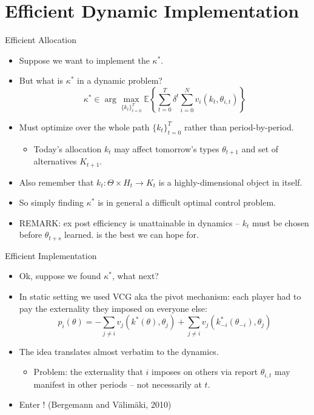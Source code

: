 \documentclass[english,10pt
,aspectratio=169
]{beamer}
\begin{document}
\section{Efficient Dynamic Implementation}

\begin{frame}{Efficient Allocation}
\begin{itemize}
	\item Suppose we want to implement the  $\kappa^*$.
	\item But what is $\kappa^*$ in a dynamic problem?
	$$ \kappa^* \in \arg \max_{\{k_t\}_{t=0}^T} \mathbb{E} \left\{ \sum_{t=0}^T \delta^t \sum_{i=0}^N v_i(k_t,\theta_{i,t}) \right\}$$
	\item Must optimize over the whole path $\{k_t\}_{t=0}^T$ rather than period-by-period.
	\begin{itemize}
		\item Today's allocation $k_t$ may affect tomorrow's types $\theta_{t+1}$ and set of alternatives $K_{t+1}$.
	\end{itemize}
	\item Also remember that $k_t : \Theta \times H_t \to K_t$ is a highly-dimensional object in itself.
	\item So simply finding $\kappa^*$ is in general a difficult optimal control problem.
	\item REMARK: \alert{ex post efficiency} is \alert{unattainable} in dynamics -- $k_t$ must be chosen before $\theta_{t+s}$ learned.  is the best we can hope for.
\end{itemize}
\end{frame}


\begin{frame}{Efficient Implementation}
\begin{itemize}
	\item Ok, suppose we found $\kappa^*$, what next?
	\item In static setting we used VCG aka the pivot mechanism: each player had to pay the externality they imposed on everyone else:
	$$ p_i(\theta) = -\sum_{j \neq i} v_j \left( k^*(\theta),\theta_j \right) + \sum_{j \neq i} v_j \left( k^*_{-i}(\theta_{-i}),\theta_j \right) $$
	\item The idea translates almost verbatim to the dynamics.
	\begin{itemize}
		\item Problem: the externality that $i$ imposes on others via report $\theta_{i,t}$ may manifest in other periods -- not necessarily at $t$.
	\end{itemize}
	\item Enter ! (Bergemann and V{\"a}lim{\"a}ki, 2010)
\end{itemize}
\end{frame}
\end{document}

